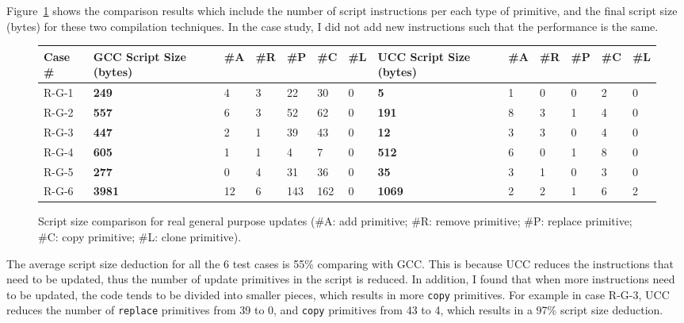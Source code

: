 Figure~\ref{fdeluge.data} shows the comparison results which include the number of script instructions per each type of 
primitive, and the final script size (bytes) for these two compilation techniques. In the case study, I did not add new 
instructions such that the performance is the same.

\begin{figure}[htbp]
\begin{center}
\begin{small}
\begin{tabular}{||p{0.5in}||p{0.38in}|p{0.15in} p{0.15in} p{0.2in} p{0.2in} p{0.15in}||
                           p{0.38in}|p{0.15in} p{0.15in} p{0.2in} p{0.2in} p{0.15in}||} \hline

Case \# & GCC Script Size (bytes) & \#A & \#R & \#P & \#C & \#L &  
          UCC Script Size (bytes) & \#A & \#R & \#P & \#C & \#L  \\ \hline \hline

R-G-1 &  \bf249 & 4&3&22&30&0    &\bf5  & 1&0&0&2&0  \\  \hline
R-G-2 &  \bf557 & 6&3&52&62&0    &\bf191& 8&3&1&4&0  \\  \hline
R-G-3 &  \bf447 & 2&1&39&43&0    &\bf12 &3&3&0&4&0   \\  \hline
R-G-4 &  \bf605 & 1&1& 4& 7&0    &\bf512 &6&0&1&8&0  \\  \hline
R-G-5 &  \bf277 & 0&4&31&36&0    &\bf35 &3&1&0&3&0  \\  \hline
R-G-6 &  \bf3981& 12&6&143&162&0 &\bf1069 &2&2&1&6&2 \\  \hline

\end{tabular}
\end{small}
\end{center}
\caption[Script size comparison for real purpose updates.]{Script size comparison for real general purpose updates 
(\#A: add primitive; \#R: remove primitive; \#P: replace primitive; \#C: copy primitive; \#L: clone primitive).}
\label{fdeluge.data}
\end{figure}

The average script size deduction for all the 6 test cases is 55\% comparing with GCC. This is because UCC reduces the 
instructions that need to be updated, thus the number of update primitives in the script is reduced. In addition, I 
found that when more instructions need to be updated, the code tends to be divided into smaller pieces, which results 
in more {\tt copy} primitives. For example in case R-G-3, UCC reduces the number of {\tt replace} primitives from 39 to 
0, and {\tt copy} primitives from 43 to 4, which results in a 97\% script size deduction.

